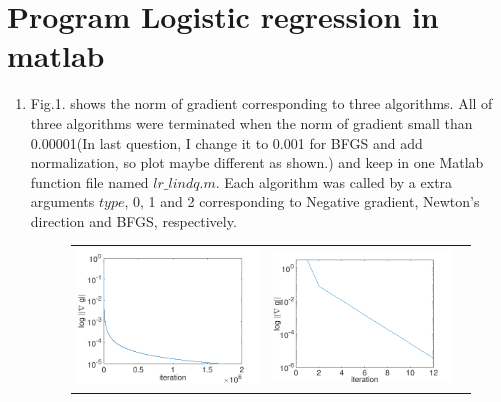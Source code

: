 \documentclass{article}
\renewcommand{\mathbf}{\boldsymbol}
\newcommand{\mb}{\mathbf}
\newcommand{\matlab}[1]{\texttt{#1}}
\begin{document}
\section{Program Logistic regression in matlab} 
\begin{enumerate}[(1)]
\item Fig.1. shows the norm of gradient corresponding to three algorithms. All of three algorithms were terminated when the norm of gradient small than 0.00001(In last question, I change it to 0.001 for BFGS and add normalization, so plot maybe different as shown.) and keep in one Matlab function file named $lr\_lindq.m$. Each algorithm was called by a extra arguments $type$, 0, 1 and 2 corresponding to Negative gradient, Newton’s direction and BFGS, respectively.
\begin{figure}[htb]
\centering
  \begin{tabular}{@{}ccc@{}}
    \includegraphics[width=.33\textwidth]{hw3_0.png} &
    \includegraphics[width=.33\textwidth]{hw3_1.png} &

\end{tabular}
\end{figure}
\end{enumerate}
\end{document}
